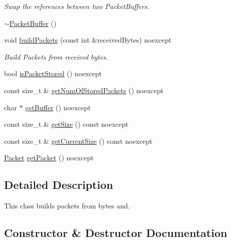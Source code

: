 \begin{DoxyCompactItemize}
\begin{DoxyCompactList}\small\item\em Swap the references between two Packet\+Buffers. \end{DoxyCompactList}\item 
\hyperlink{classtnnf_1_1_packet_buffer_a5a962401516828ef393e69d61d5fd3d6}{$\sim$\+Packet\+Buffer} ()
\item 
void \hyperlink{classtnnf_1_1_packet_buffer_adcdb6c55ea7dacf133d6023ac22c1210}{build\+Packets} (const int \&received\+Bytes) noexcept
\begin{DoxyCompactList}\small\item\em Build Packets from received bytes. \end{DoxyCompactList}\item 
bool \hyperlink{classtnnf_1_1_packet_buffer_a79ac7560d2e7dda075eacbfb0d7ea572}{is\+Packet\+Stored} () noexcept
\item 
const size\+\_\+t \& \hyperlink{classtnnf_1_1_packet_buffer_abdbab0715e0c034cd64217ca89b3038b}{get\+Num\+Of\+Stored\+Packets} () noexcept
\item 
char $\ast$ \hyperlink{classtnnf_1_1_packet_buffer_a19e723b7d1956ae5d0bc82399c08d754}{get\+Buffer} () noexcept
\item 
const size\+\_\+t \& \hyperlink{classtnnf_1_1_packet_buffer_a7372d2a4bbaf72994f151e2c71340d61}{get\+Size} () const noexcept
\item 
const size\+\_\+t \& \hyperlink{classtnnf_1_1_packet_buffer_a26ce7667e35c0f09c6dd989cfca107ab}{get\+Current\+Size} () const noexcept
\item 
\hyperlink{classtnnf_1_1_packet}{Packet} \hyperlink{classtnnf_1_1_packet_buffer_a60a8858e349105d35f983c2fa2516a36}{get\+Packet} () noexcept
\end{DoxyCompactItemize}


\subsection{Detailed Description}
This class builds packets from bytes and. 

\subsection{Constructor \& Destructor Documentation}
\hypertarget{classtnnf_1_1_packet_buffer_a8ac26d292ab3f11539b2e8302ab65bc3}{}
